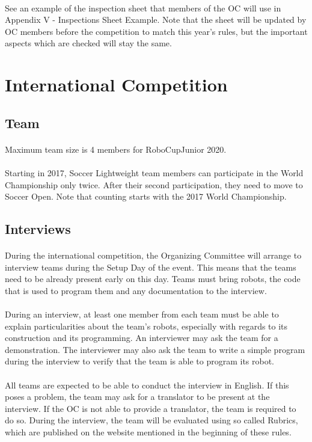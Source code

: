 \documentclass{article}
\newcommand*{\p}{\paragraph{}}
\begin{document}
\p See an example of the inspection sheet that members of the OC will use in
Appendix V - Inspections Sheet Example. Note that the sheet will be updated by
OC members before the competition to match this year's rules, but the important
aspects which are checked will stay the same.


\newpage

\section{International Competition}

\subsection{Team}

\p Maximum team size is 4 members for RoboCupJunior 2020.

\p Starting in 2017, Soccer Lightweight team members can participate in the World
Championship only twice. After their second participation, they need to move to
Soccer Open. Note that counting starts with the 2017 World Championship.

\subsection{Interviews \label{ref-060}}

\p During the international competition, the Organizing Committee will arrange to
interview teams during the Setup Day of the event. This means that the teams
need to be already present early on this day. Teams must bring robots, the code
that is used to program them and any documentation to the interview.

\p During an interview, at least one member from each team must be able to explain
particularities about the team's robots, especially with regards to its
construction and its programming. An interviewer may ask the team for a
demonstration. The interviewer may also ask the team to write a simple program
during the interview to verify that the team is able to program its robot.

\p All teams are expected to be able to conduct the interview in English. If this
poses a problem, the team may ask for a translator to be present at the
interview. If the OC is not able to provide a translator, the team is required
to do so. During the interview, the team will be evaluated using so called
Rubrics, which are published on the website mentioned in the beginning of these
rules.
\end{document}
